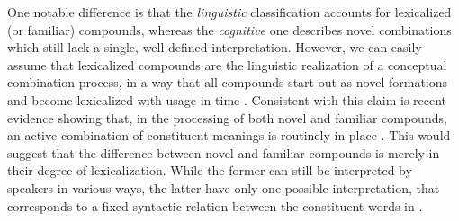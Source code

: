 \documentclass[output=paper]{langsci/langscibook}
\begin{document}
One notable difference is that the \emph{linguistic} classification accounts for lexicalized (or familiar) compounds, whereas the \emph{cognitive} one describes novel combinations which still lack a single, well-defined interpretation. However, we can easily assume that lexicalized compounds are the linguistic realization of a conceptual combination process, in a way that all compounds start out as novel formations and become lexicalized with usage in time \citep{gagne2006}. Consistent with this claim is recent evidence showing that, in the processing of both novel and familiar compounds, an active combination of constituent meanings is routinely in place \citep{gagnesp2009,ji2011,marelli2012,marelli2014}. This would suggest that the difference between novel and familiar compounds is merely in their degree of lexicalization. While the former can still be interpreted by speakers in various ways, the latter have only one possible interpretation, that corresponds to a fixed syntactic relation between the constituent words in \cite{SB2005}.

\end{document}
